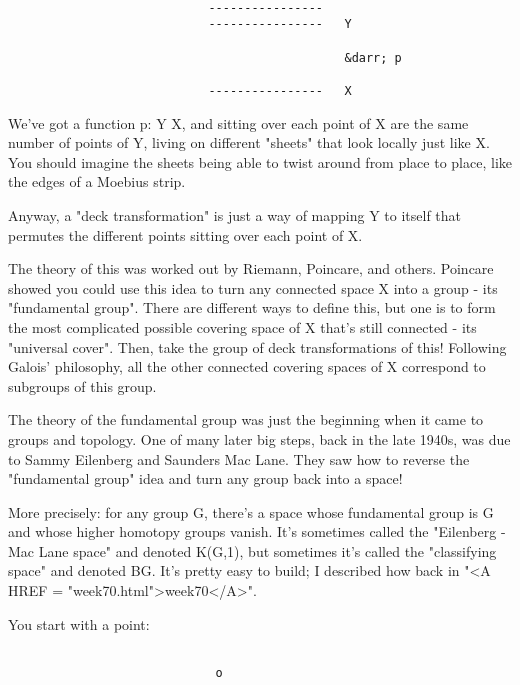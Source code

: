 \begin{verbatim}

                            ----------------   
                            ----------------   Y 
                                               
                                               &darr; p
                                               
                            ----------------   X
\end{verbatim}
    
We've got a function p: Y \to  X, and sitting over each point of X are 
the same number of points of Y, living on different "sheets" that look
locally just like X.   You should imagine the sheets being able to 
twist around from place to place, like the edges of a Moebius strip.

Anyway, a "deck transformation" is just a way of mapping Y to itself 
that permutes the different points sitting over each point of X.  

The theory of this was worked out by Riemann, Poincare, and others.  
Poincare showed you could use this idea to turn any connected space X 
into a group - its "fundamental group".  There are different ways to
define this, but one is to form the most complicated possible 
covering space of X that's still connected - its "universal cover".
Then, take the group of deck transformations of this!  Following 
Galois' philosophy, all the other connected covering spaces of X 
correspond to subgroups of this group.  

The theory of the fundamental group was just the beginning when 
it came to groups and topology.  One of many later big steps, back 
in the late 1940s, was due to Sammy Eilenberg and Saunders Mac Lane.  
They saw how to reverse the "fundamental group" idea and turn any 
group back into a space!   

More precisely: for any group G, there's a space whose fundamental group
is G and whose higher homotopy groups vanish.  It's sometimes called the 
"Eilenberg - Mac Lane space" and denoted K(G,1), but sometimes it's called
the "classifying space" and denoted BG.  It's pretty easy to build; 
I described how back in "<A HREF = "week70.html">week70</A>".  

You start with a point:


\begin{verbatim}

                             o
\end{verbatim}
    
